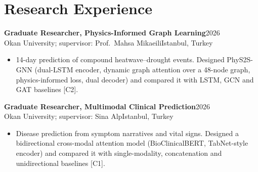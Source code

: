 \documentclass[11pt,letterpaper]{article}
\newcommand{\entry}[4]{
  \textbf{#1}\hfill #2\\
  #3\hfill #4\par\vspace{1pt}}
\begin{document}
\section{Research Experience}
\entry{Graduate Researcher, Physics-Informed Graph Learning}{2026}
      {Okan University; supervisor: Prof.\ Mahsa Mikaeili}{Istanbul, Turkey}
\begin{itemize}
  \item 14-day prediction of compound heatwave--drought events. Designed PhyS2S-GNN (dual-LSTM encoder, dynamic graph attention
        over a 48-node graph, physics-informed loss, dual decoder) and compared it with LSTM, GCN and GAT baselines [C2].
\end{itemize}
\vspace{2pt}
\entry{Graduate Researcher, Multimodal Clinical Prediction}{2026}
      {Okan University; supervisor: Sina Alp}{Istanbul, Turkey}
\begin{itemize}
  \item Disease prediction from symptom narratives and vital signs. Designed a bidirectional cross-modal attention model
        (BioClinicalBERT, TabNet-style encoder) and compared it with single-modality, concatenation and unidirectional baselines [C1].
\end{itemize}
\end{document}
